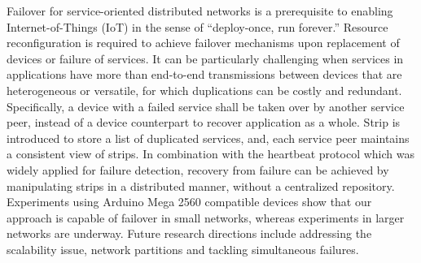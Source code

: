 \begin{abstractEN}

\noindent Failover for service-oriented distributed networks is a prerequisite
to enabling Internet-of-Things (IoT) in the sense of “deploy-once, run forever.”
Resource reconfiguration is required to achieve failover mechanisms upon
replacement of devices or failure of services. It can be particularly
challenging when services in applications have more than end-to-end
transmissions between devices that are heterogeneous or versatile, for which
duplications can be costly and redundant. Specifically, a device with a failed
service shall be taken over by another service peer, instead of a device
counterpart to recover application as a whole. Strip is introduced to store
a list of duplicated services, and, each service peer
maintains a consistent view of strips. In combination with the heartbeat
protocol which was widely applied for failure detection, recovery from failure
can be achieved by manipulating strips in a distributed manner, without
a centralized repository. Experiments using Arduino Mega 2560 compatible devices
show that our approach is capable of failover in small networks, whereas
experiments in larger networks are underway. Future research directions include
addressing the scalability issue, network partitions and tackling simultaneous
failures.

\end{abstractEN}

\begin{comment}


\terms{System, Policy}

\keywords{Service-Oriented WSN, Fault Tolerance}

\end{comment}
